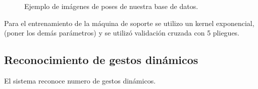 \begin{figure}[h!]
\begin{center}
\end{center}
\caption{Ejemplo de imágenes de poses de nuestra base de datos.}
\label{fig:SVMTrainingStatic}
\end{figure}

Para el entrenamiento de la máquina de soporte se utilizo un kernel exponencial, (poner los demás parámetros) y se utilizó validación cruzada con 5 pliegues. 

\subsection{Reconocimiento de gestos dinámicos}\label{RecognitionDynamic}

El sistema reconoce numero de gestos dinámicos.  

%


%
%
%
%  
	
\newpage

